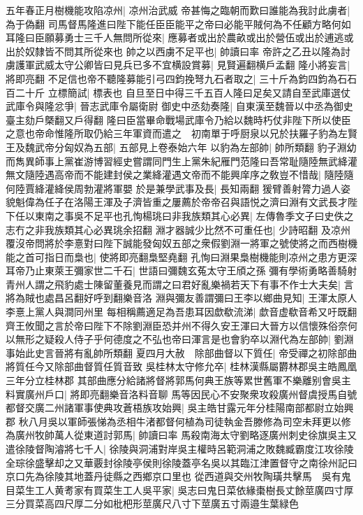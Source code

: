 五年春正月樹機能攻陷凉州|{
	凉州治武威}
帝甚悔之臨朝而歎曰誰能為我討此虜者|{
	為于偽翻}
司馬督馬隆進曰陛下能任臣臣能平之帝曰必能平賊何為不任顧方略何如耳隆曰臣願募勇士三千人無問所從來|{
	應募者或出於農畝或出於營伍或出於逋逃或出於奴隸皆不問其所從來也}
帥之以西虜不足平也|{
	帥讀曰率}
帝許之乙丑以隆為討虜護軍武威太守公卿皆曰見兵已多不宜横設賞募|{
	見賢遍翻横戶孟翻}
隆小將妄言|{
	將即亮翻}
不足信也帝不聽隆募能引弓四鈞挽弩九石者取之|{
	三十斤為鈞四鈞為石石百二十斤}
立標簡試|{
	標表也}
自旦至日中得三千五百人隆曰足矣又請自至武庫選仗武庫令與隆忿爭|{
	晉志武庫令屬衛尉}
御史中丞劾奏隆|{
	自東漢至魏晉以中丞為御史臺主劾戶槩翻又戶得翻}
隆曰臣當畢命戰場武庫令乃給以魏時朽仗非陛下所以使臣之意也帝命惟隆所取仍給三年軍資而遣之　初南單于呼厨泉以兄於扶羅子豹為左賢王及魏武帝分匈奴為五部|{
	五部見上卷泰始六年}
以豹為左部帥|{
	帥所類翻}
豹子淵幼而雋異師事上黨崔游博習經史嘗謂同門生上黨朱紀雁門范隆曰吾常耻隨陸無武絳灌無文隨陸遇高帝而不能建封侯之業絳灌遇文帝而不能興庠序之敎豈不惜哉|{
	隨陸隨何陸賈絳灌絳侯周勃灌將軍嬰}
於是兼學武事及長|{
	長知兩翻}
猨臂善射膂力過人姿貌魁偉為任子在洛陽王渾及子濟皆重之屢薦於帝帝召與語悦之濟曰淵有文武長才陛下任以東南之事吳不足平也孔恂楊珧曰非我族類其心必異|{
	左傳魯季文子曰史佚之志冇之非我族類其心必異珧余招翻}
淵才器誠少比然不可重任也|{
	少詩昭翻}
及凉州覆沒帝問將於李憙對曰陛下誠能發匈奴五部之衆假劉淵一將軍之號使將之而西樹機能之首可指日而梟也|{
	使將即亮翻梟堅堯翻}
孔恂曰淵果梟樹機能則凉州之患方更深耳帝乃止東萊王彌家世二千石|{
	世語曰彌魏玄菟太守王頎之孫}
彌有學術勇略善騎射青州人謂之飛豹處士陳留董養見而謂之曰君好亂樂禍若天下有事不作士大夫矣|{
	言將為賊也處昌呂翻好呼到翻樂音洛}
淵與彌友善謂彌曰王李以鄉曲見知|{
	王渾太原人李憙上黨人與澗同州里}
每相稱薦適足為吾患耳因歔欷流涕|{
	歔音虚欷音希又吁既翻}
齊王攸聞之言於帝曰陛下不除劉淵臣恐并州不得久安王渾曰大晉方以信懷殊俗奈何以無形之疑殺人侍子乎何德度之不弘也帝曰渾言是也會豹卒以淵代為左部帥|{
	劉淵事始此史言晉將有亂帥所類翻}
夏四月大赦　除部曲督以下質任|{
	帝受禪之初除部曲將質任今又除部曲督質任質音致}
吳桂林太守修允卒|{
	桂林漢縣屬欝林郡吳主皓鳳凰三年分立桂林郡}
其部曲應分給諸將督將郭馬何典王族等累世舊軍不樂離别會吳主料實廣州戶口|{
	將即亮翻樂音洛料音聊}
馬等因民心不安聚衆攻殺廣州督虞授馬自號都督交廣二州諸軍事使典攻蒼梧族攻始興|{
	吳主皓甘露元年分桂陽南部都尉立始興郡}
秋八月吳以軍師張悌為丞相牛渚都督何植為司徒執金吾滕修為司空未拜更以修為廣州牧帥萬人從東道討郭馬|{
	帥讀曰率}
馬殺南海太守劉略逐廣州刺史徐旗吳主又遣徐陵督陶濬將七千人|{
	徐陵與洞浦對岸吳主權時呂範洞浦之敗魏臧霸度江攻徐陵全琮徐盛擊却之又華覈封徐陵亭侯則徐陵蓋亭名吳以其臨江津置督守之南徐州記曰京口先為徐陵其地蓋丹徒縣之西鄉京口里也}
從西道與交州牧陶璜共擊馬　吳有鬼目菜生工人黄耉家有買菜生工人吳平家|{
	吳志曰鬼日菜依緣棗樹長丈餘莖廣四寸厚三分買菜高四尺厚二分如枇杷形莖廣尺八寸下莖廣五寸兩邉生葉緑色}
